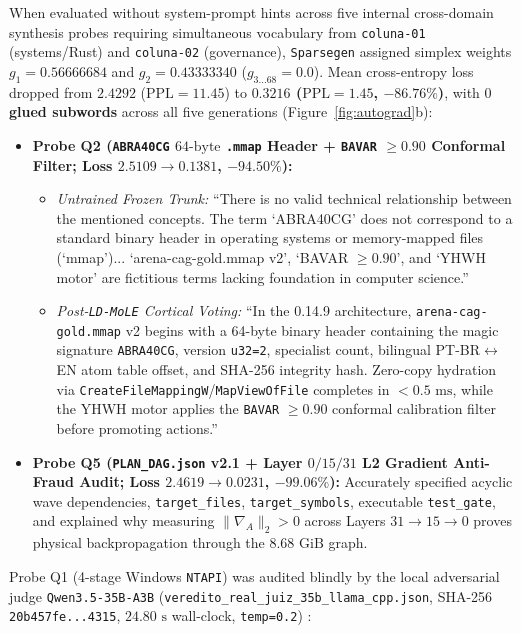 \documentclass[10pt,a4paper]{article}
\begin{document}
When evaluated without system-prompt hints across five internal cross-domain synthesis probes requiring simultaneous vocabulary from \texttt{coluna-01} (systems/Rust) and \texttt{coluna-02} (governance), \texttt{Sparsegen} assigned simplex weights $g_1 = 0.56666684$ and $g_2 = 0.43333340$ ($g_{3\dots 68} = 0.0$). Mean cross-entropy loss dropped from $2.4292$ ($\text{PPL}=11.45$) to \textbf{$0.3216$ ($\text{PPL}=1.45$, $-86.76\%$)}, with \textbf{$0$ glued subwords} across all five generations (Figure~\ref{fig:autograd}b):
\begin{itemize}
  \item \textbf{Probe Q2 (\texttt{ABRA40CG} $64\text{-byte}$ \texttt{.mmap} Header + \texttt{BAVAR} $\ge 0.90$ Conformal Filter; Loss $2.5109 \to 0.1381$, $-94.50\%$):}
    \begin{itemize}
      \item \textit{Untrained Frozen Trunk:} ``There is no valid technical relationship between the mentioned concepts. The term `ABRA40CG' does not correspond to a standard binary header in operating systems or memory-mapped files (`mmap')... `arena-cag-gold.mmap v2', `BAVAR $\ge 0.90$', and `YHWH motor' are fictitious terms lacking foundation in computer science.''
      \item \textit{Post-\texttt{LD-MoLE} Cortical Voting:} ``In the 0.14.9 architecture, \texttt{arena-cag-gold.mmap} v2 begins with a 64-byte binary header containing the magic signature \texttt{ABRA40CG}, version \texttt{u32=2}, specialist count, bilingual PT-BR$\leftrightarrow$EN atom table offset, and SHA-256 integrity hash. Zero-copy hydration via \texttt{CreateFileMappingW}/\texttt{MapViewOfFile} completes in $<0.5\text{ ms}$, while the YHWH motor applies the \texttt{BAVAR} $\ge 0.90$ conformal calibration filter before promoting actions.''
    \end{itemize}
  \item \textbf{Probe Q5 (\texttt{PLAN\_\allowbreak{}DAG.json} v2.1 + Layer $0/15/31$ L2 Gradient Anti-Fraud Audit; Loss $2.4619 \to 0.0231$, $-99.06\%$):} Accurately specified acyclic wave dependencies, \texttt{target\_\allowbreak{}files}, \texttt{target\_\allowbreak{}symbols}, executable \texttt{test\_\allowbreak{}gate}, and explained why measuring $\|\nabla_A\|_2 > 0$ across Layers $31 \to 15 \to 0$ proves physical backpropagation through the $8.68\text{ GiB}$ graph.
\end{itemize}

Probe Q1 (4-stage Windows \texttt{NTAPI}) was audited blindly by the local adversarial judge \texttt{Qwen3.5-35B-A3B} (\texttt{veredito\_\allowbreak{}real\_\allowbreak{}juiz\_\allowbreak{}35b\_\allowbreak{}llama\_\allowbreak{}cpp.json}, SHA-256 \texttt{20b457fe...4315}, $24.80\text{ s}$ wall-clock, \texttt{temp=0.2}) \cite{zheng2023judging}:
\end{document}
